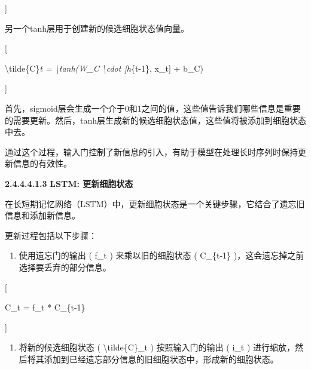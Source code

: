 {]}


另一个tanh层用于创建新的候选细胞状态值向量。

{[}

\textbackslash tilde\{C\}\emph{t = \textbackslash tanh(W\_C
\textbackslash cdot {[}h}\{t-1\}, x\_t{]} + b\_C)

{]}


首先，sigmoid层会生成一个介于0和1之间的值，这些值告诉我们哪些信息是重要的需要更新。然后，tanh层生成新的候选细胞状态值，这些值将被添加到细胞状态中去。

通过这个过程，输入门控制了新信息的引入，有助于模型在处理长时序列时保持更新信息的有效性。

\textbf{2.4.4.4.1.3} \textbf{LSTM: 更新细胞状态}

在长短期记忆网络（LSTM）中，更新细胞状态是一个关键步骤，它结合了遗忘旧信息和添加新信息。


更新过程包括以下步骤：

\begin{enumerate}
\def\labelenumi{\arabic{enumi}.}
\item
  使用遗忘门的输出 ( f\_t ) 来乘以旧的细胞状态 ( C\_\{t-1\}
  )，这会遗忘掉之前选择要丢弃的部分信息。
\end{enumerate}

{[}

C\_t = f\_t * C\_\{t-1\}

{]}


\begin{enumerate}
\def\labelenumi{\arabic{enumi}.}
\item
  将新的候选细胞状态 ( \textbackslash tilde\{C\}\_t ) 按照输入门的输出 (
  i\_t )
  进行缩放，然后将其添加到已经遗忘部分信息的旧细胞状态中，形成新的细胞状态。
\end{enumerate}

